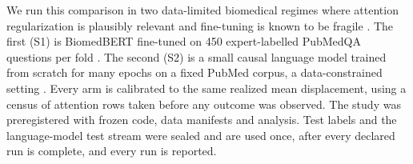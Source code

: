 We run this comparison in two data-limited biomedical regimes where attention regularization is
plausibly relevant and fine-tuning is known to be fragile \citep{mosbach2021stability,dodge2020finetuning,zhang2021revisiting}.
The first (S1) is BiomedBERT fine-tuned on 450 expert-labelled PubMedQA questions per fold
\citep{jin2019pubmedqa}. The second (S2) is a small causal language model trained from scratch for
many epochs on a fixed PubMed corpus, a data-constrained setting \citep{muennighoff2023scaling}. Every
arm is calibrated to the same realized mean displacement, using a census of attention rows taken
before any outcome was observed. The study was preregistered with frozen code, data manifests and
analysis. Test labels and the language-model test stream were sealed and are used once, after every
declared run is complete, and every run is reported.

